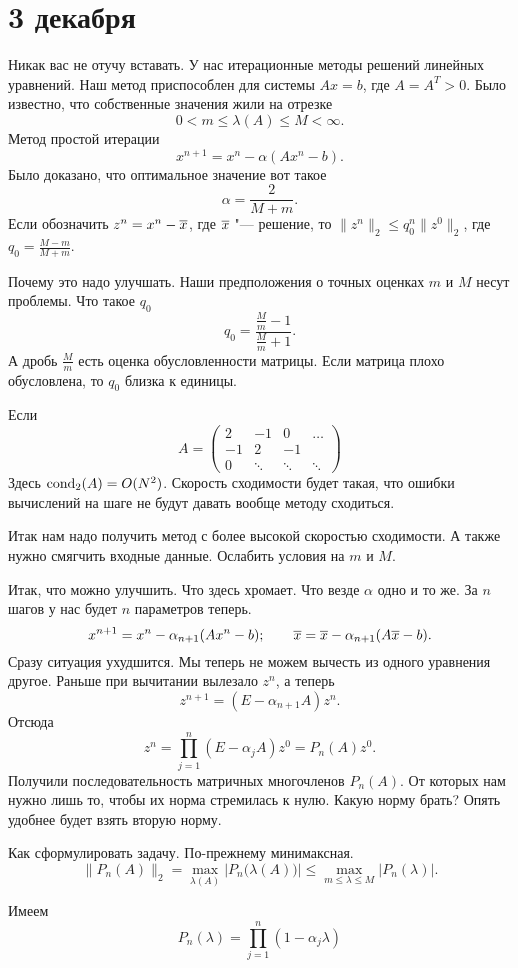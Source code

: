 \section{3 декабря}
Никак вас не отучу вставать. У нас итерационные методы решений линейных уравнений. Наш метод приспособлен для системы $Ax = b$, где $A = A^T>0$. Было известно, что собственные значения жили на отрезке
\[
  0< m \le \lambda(A)\le M<\infty.
\]
Метод простой итерации
\[
  x^{n+1} = x^n - \alpha (A x^n -b).
\]
Было доказано, что оптимальное значение вот такое
\[
  \alpha = \frac2{M+m}.
\]
Если обозначить $z^n = x^n -\overline{x}$, где $\overline{x} $ "--- решение, то $\|z^n\|_2\le q^n_0\|z^0\|_2$, где $q_0 = \frac{M-m}{M+m}$.

Почему это надо улучшать. Наши предположения о точных оценках $m$ и $M$ несут проблемы. Что такое $q_0$
\[
  q_0 = \frac{\frac Mm - 1}{\frac Mm+1}.
\]
А дробь $\frac{M}m$ есть оценка обусловленности матрицы. Если матрица плохо обусловлена, то $q_0$ близка к единицы.

Если 
\[
  A = \begin{pmatrix}
 2 & -1 & 0 & \dots\\
 -1 & 2 & -1 & \\
 0 & \ddots & \ddots & \ddots
\end{pmatrix}
\]
Здесь $\operatorname{cond}_2(A) = O(N^2)$. Скорость сходимости будет такая, что ошибки вычислений на шаге не будут давать вообще методу сходиться.

Итак нам надо получить метод с более высокой скоростью сходимости. А также нужно смягчить входные данные. Ослабить условия на $m$ и $M$.

Итак, что можно улучшить. Что здесь хромает. Что везде $\alpha$ одно и то же. За $n$ шагов у нас будет $n$ параметров теперь.
\[
  x^{n+1} = x^n - \alpha_{n+1}(A x^n - b);\qquad
  \overline{x} = \overline{x} - \alpha_{n+1}(A\overline{x} - b).
\]
Сразу ситуация ухудшится. Мы теперь не можем вычесть из одного уравнения другое. Раньше при вычитании вылезало $z^n$, а теперь
\[
  z^{n+1} = (E - \alpha_{n+1} A)z^n.
\]
Отсюда
\[
  z^n = \prod\limits_{j=1}^n(E - \alpha_j A)z^0 = P_n(A)z^0.
\]
Получили последовательность матричных многочленов $P_n(A)$. От которых нам нужно лишь то, чтобы их норма стремилась к нулю. Какую норму брать? Опять удобнее будет взять вторую норму.

Как сформулировать задачу. По-прежнему минимаксная.
\[
 \|P_n(A)\|_2 = \max\limits_{\lambda(A)} \big|P_n\big(\lambda(A)\big)\big|\le \max\limits_{m\le \lambda\le M} \big|P_n(\lambda)\big|.
\]

Имеем
\[
  P_n(\lambda) = \prod\limits_{j=1}^n(1-\alpha_j\lambda)
\]

